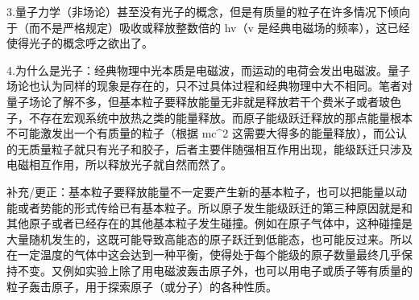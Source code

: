 \begin{itemize}
3.量子力学（非场论）甚至没有光子的概念，但是有质量的粒子在许多情况下倾向于（而不是严格规定）吸收或释放整数倍的 hv（v 是经典电磁场的频率），这已经使得光子的概念呼之欲出了。

4.为什么是光子：经典物理中光本质是电磁波，而运动的电荷会发出电磁波。量子场论也认为同样的现象是存在的，只不过具体过程和经典物理中大不相同。笔者对量子场论了解不多，但基本粒子要释放能量无非就是释放若干个费米子或者玻色子，不存在宏观系统中放热之类的能量释放。而原子能级跃迁释放的那点能量根本不可能激发出一个有质量的粒子（根据 mc^2 这需要大得多的能量释放），而公认的无质量粒子就只有光子和胶子，后者主要伴随强相互作用出现，能级跃迁只涉及电磁相互作用，所以释放光子就自然而然了。

补充/更正：基本粒子要释放能量不一定要产生新的基本粒子，也可以把能量以动能或者势能的形式传给已有基本粒子。所以原子发生能级跃迁的第三种原因就是和其他原子或者已经存在的其他基本粒子发生碰撞。例如在原子气体中，这种碰撞是大量随机发生的，这既可能导致高能态的原子跃迁到低能态，也可能反过来。所以在一定温度的气体中这会达到一种平衡，使得处于每个能级的原子数量最终几乎保持不变。又例如实验上除了用电磁波轰击原子外，也可以用电子或质子等有质量的粒子轰击原子，用于探索原子（或分子）的各种性质。


\end{itemize}
